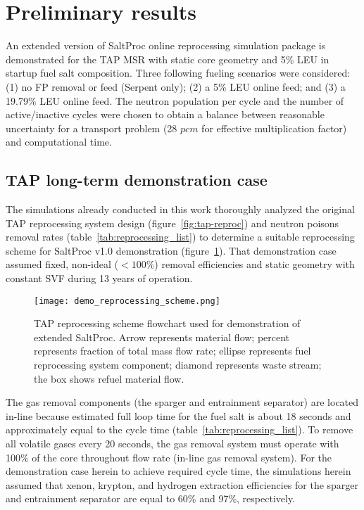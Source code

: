 \section{Preliminary results} \label{sec:stage2-demo}
An extended version of SaltProc online reprocessing simulation package is 
demonstrated for the \gls{TAP} \gls{MSR} with static core geometry and 5\% 
\gls{LEU} in startup fuel salt composition. Three following fueling
scenarios 
were considered: (1) no \gls{FP} removal or feed (Serpent only); (2) a 5\% 
\gls{LEU} online feed; and (3)
a 19.79\% \gls{LEU} online feed. 
The neutron population per cycle and the number of active/inactive cycles
were 
chosen to obtain a balance between reasonable uncertainty for a transport 
problem
(28 $pcm$ for effective multiplication factor) and computational time. 
\subsection{TAP long-term demonstration case} 
The simulations already conducted in this work thoroughly analyzed the 
original \gls{TAP} reprocessing system design (figure~\ref{fig:tap-reproc}) 
and neutron poisons removal rates  (table~\ref{tab:reprocessing_list}) to 
determine a suitable reprocessing scheme for SaltProc v1.0 demonstration 
(figure~\ref{fig:demo-repro-scheme}). That demonstration case assumed fixed, 
non-ideal ($<100$\%) removal efficiencies and static geometry with constant 
\gls{SVF} during 13 years of operation.
\begin{figure}[htp!] %
	\centering
	\texttt{[image: demo\_reprocessing\_scheme.png]}
	\caption{\gls{TAP} reprocessing scheme flowchart used for demonstration of 
	extended SaltProc. Arrow represents material flow; percent represents  
		fraction of total mass flow rate; ellipse represents fuel reprocessing 
		system component; diamond represents waste stream; the box shows 
		refuel material flow.}
	\label{fig:demo-repro-scheme}
\end{figure}

The gas removal components (the sparger and entrainment separator) are located 
in-line because estimated full loop time for the fuel salt is about 18 seconds 
and approximately equal to the cycle time (table~\ref{tab:reprocessing_list}). 
To remove all volatile gases every 20 seconds, the gas removal system must 
operate with 100\% of the core throughout flow rate (in-line gas removal 
system). For the demonstration case herein to achieve required cycle time, the 
simulations herein assumed that xenon, krypton, and hydrogen extraction 
efficiencies for the sparger and entrainment separator are equal to 60\% and 
97\%, respectively.

